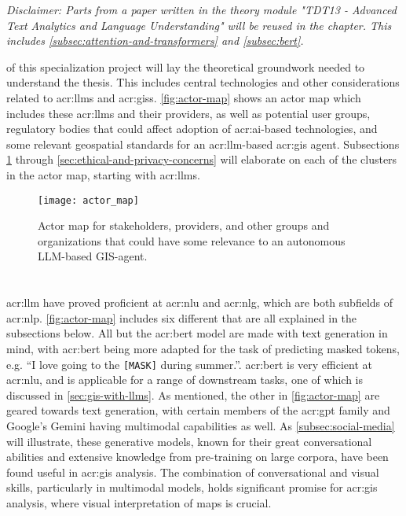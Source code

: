 \textit{Disclaimer: Parts from a paper written in the theory module "TDT13 - Advanced Text Analytics and Language Understanding" will be reused in the  chapter. This includes \autoref{subsec:attention-and-transformers} and \autoref{subsec:bert}.}

\vspace{12pt}

 of this specialization project will lay the theoretical groundwork needed to understand the thesis. This includes central technologies and other considerations related to \glspl{acr:llm} and \glspl{acr:gis}. \autoref{fig:actor-map} shows an actor map which includes these \glspl{acr:llm} and their providers, as well as potential user groups, regulatory bodies that could affect adoption of \acrshort{acr:ai}-based technologies, and some relevant geospatial standards for an \acrshort{acr:llm}-based \acrshort{acr:gis} agent. Subsections \ref{sec:llms} through \ref{sec:ethical-and-privacy-concerns} will elaborate on each of the clusters in the actor map, starting with \glspl{acr:llm}.

\begin{figure}
    \texttt{[image: actor\_map]}
    \caption{Actor map for stakeholders, providers, and other groups and organizations that could have some relevance to an autonomous LLM-based GIS-agent.}
    \label{fig:actor-map}
\end{figure}

\section[Large Language Models]{}\label{sec:llms}

\acrfull{acr:llm} have proved proficient at \gls{acr:nlu} and \gls{acr:nlg}, which are both subfields of \gls{acr:nlp}. \autoref{fig:actor-map} includes six different  that are all explained in the subsections below. All but the \acrshort{acr:bert} model are made with text generation in mind, with \acrshort{acr:bert} being more adapted for the task of predicting masked tokens, e.g. \enquote{I love going to the \texttt{[MASK]} during summer.}. \acrshort{acr:bert} is very efficient at \gls{acr:nlu}, and is applicable for a range of downstream tasks, one of which is discussed in \autoref{sec:gis-with-llms}. As mentioned, the other  in \autoref{fig:actor-map} are geared towards text generation, with certain members of the \acrshort{acr:gpt} family and Google's Gemini having multimodal capabilities as well. As \autoref{subsec:social-media} will illustrate, these generative models, known for their great conversational abilities and extensive knowledge from pre-training on large corpora, have been found useful in \gls{acr:gis} analysis. The combination of conversational and visual skills, particularly in multimodal models, holds significant promise for \gls{acr:gis} analysis, where visual interpretation of maps is crucial.

